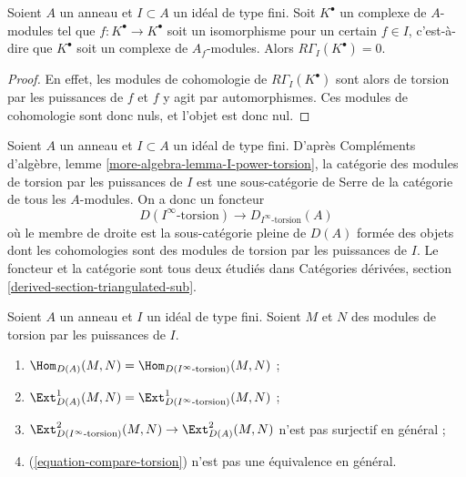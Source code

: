 \begin{lemma}
\label{lemma-bad-local-cohomology-vanishes}
Soient $A$ un anneau et $I \subset A$ un idéal de type fini.
Soit $K^\bullet$ un complexe de $A$-modules tel que
$f : K^\bullet \to K^\bullet$ soit un isomorphisme pour un certain $f \in I$,
c'est-à-dire que $K^\bullet$ soit un complexe de $A_f$-modules. Alors
$R\Gamma_I(K^\bullet) = 0$.
\end{lemma}

\begin{proof}
En effet, les modules de cohomologie de $R\Gamma_I(K^\bullet)$ sont alors de torsion
par les puissances de $f$ et $f$ y agit par automorphismes.
Ces modules de cohomologie sont donc nuls, et l'objet est donc nul.
\end{proof}

\noindent
Soient $A$ un anneau et $I \subset A$ un idéal de type fini.
D'après Compléments d'algèbre, lemme \ref{more-algebra-lemma-I-power-torsion}, la catégorie des modules
de torsion par les puissances de $I$ est une sous-catégorie de Serre
de la catégorie de tous les $A$-modules. On a donc un foncteur
\begin{equation}
\label{equation-compare-torsion}
D(I^\infty\text{-torsion}) \longrightarrow D_{I^\infty\text{-torsion}}(A)
\end{equation}
où le membre de droite est la sous-catégorie pleine de $D(A)$
formée des objets dont les cohomologies sont des modules de torsion
par les puissances de $I$. Le foncteur et la catégorie sont tous deux
étudiés dans Catégories dérivées, section \ref{derived-section-triangulated-sub}.

\begin{lemma}
\label{lemma-not-equal}
Soient $A$ un anneau et $I$ un idéal de type fini.
Soient $M$ et $N$ des modules de torsion par les puissances de $I$.
\begin{enumerate}
\item $\Hom_{D(A)}(M, N) = \Hom_{D({I^\infty\text{-torsion}})}(M, N)$ ;
\item $\Ext^1_{D(A)}(M, N) =
\Ext^1_{D({I^\infty\text{-torsion}})}(M, N)$ ;
\item $\Ext^2_{D({I^\infty\text{-torsion}})}(M, N) \to
\Ext^2_{D(A)}(M, N)$ n'est pas surjectif en général ;
\item (\ref{equation-compare-torsion}) n'est pas une équivalence en général.
\end{enumerate}
\end{lemma}


